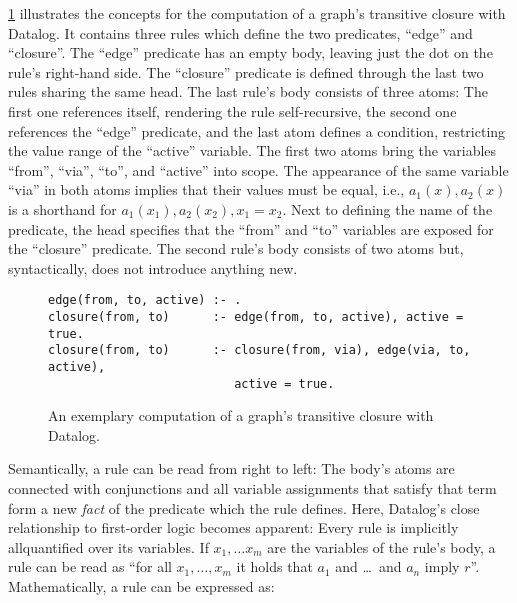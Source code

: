 \ref{code:trans-closure-datalog} illustrates the concepts for the
computation of a graph's transitive closure with Datalog.
It contains three rules which define the two predicates, ``edge'' and ``closure''.
The ``edge'' predicate has an empty body,
leaving just the dot on the rule's right-hand side.
The ``closure'' predicate is defined through the last two rules sharing
the same head.
The last rule's body consists of three atoms: The first one references itself,
rendering the rule self-recursive, the second one references the ``edge'' predicate,
and the last atom defines a condition, restricting the value range of the
``active'' variable.
The first two atoms bring the variables ``from'', ``via'', ``to'', and ``active''
into scope.
The appearance of the same variable ``via'' in both atoms implies that their
values must be equal, i.e.,
\(a_1(x), a_2(x)\) is a shorthand for \(a_1(x_1), a_2(x_2), x_1 = x_2\).
Next to defining the name of the predicate, the head specifies that the ``from''
and ``to'' variables are exposed for the ``closure'' predicate.
The second rule's body consists of two atoms but, syntactically,
does not introduce anything new.

\begin{figure}[htpb]
	\centering
	\begin{lstlisting}[keepspaces]
edge(from, to, active) :- .
closure(from, to)      :- edge(from, to, active), active = true.
closure(from, to)      :- closure(from, via), edge(via, to, active),
                          active = true.\end{lstlisting}
	\caption{An exemplary computation of a graph's transitive closure with Datalog.}\label{code:trans-closure-datalog}
\end{figure}

Semantically, a rule can be read from right to left: The body's atoms are
connected with conjunctions and all variable assignments that satisfy that term
form a new \emph{fact} of the predicate which the rule defines.
Here, Datalog's close relationship to first-order logic becomes apparent:
Every rule is implicitly allquantified over its variables.
If \(x_1, \ldots x_m\) are the variables of the rule's body, a rule can be read as
``for all \(x_1, \ldots, x_m\) it holds that \(a_1\) and \ldots\ and \(a_n\) imply \(r\)''.
Mathematically, a rule can be expressed as\footnotemark{}:


